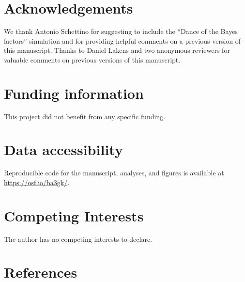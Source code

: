 \documentclass[
  english,
  man, donotrepeattitle,mask,floatsintext]{apa6}
\begin{document}
\hypertarget{acknowledgements}{%
\section*{Acknowledgements}\label{acknowledgements}}

We thank Antonio Schettino for suggesting to include the ``Dance of the Bayes factors'' simulation and for providing helpful comments on a previous version of this manuscript. Thanks to Daniel Lakens and two anonymous reviewers for valuable comments on previous versions of this manuscript.

\hypertarget{funding-information}{%
\section{Funding information}\label{funding-information}}

This project did not benefit from any specific funding.

\hypertarget{supp}{%
\section{Data accessibility}\label{supp}}

Reproducible code for the manuscript, analyses, and figures is available at \url{https://osf.io/ba3gk/}.

\hypertarget{competing-interests}{%
\section{Competing Interests}\label{competing-interests}}

The author has no competing interests to declare.

\hypertarget{references}{%
\section*{References}\label{references}}
\end{document}
